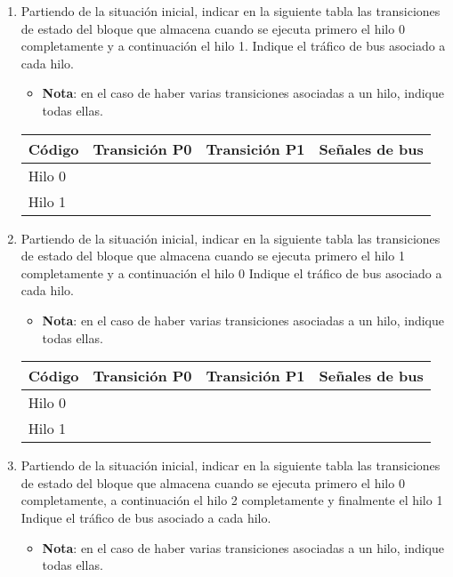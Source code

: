 \begin{enumerate}

\item Partiendo de la situación inicial, indicar en la siguiente tabla las
transiciones de estado del bloque que almacena  cuando se ejecuta primero el
hilo 0 completamente y a continuación el hilo 1. Indique el tráfico de bus
asociado a cada hilo. 
  \begin{itemize}
    \item \textbf{Nota}: en el caso de haber varias transiciones asociadas a un hilo, 
          indique todas ellas.
  \end{itemize}

\begin{tabular}{|l|l|l|l|}
\hline
Código & Transición P0 & Transición P1 & Señales de bus\\
\hline\hline
Hilo 0 & & & \\
\hline
Hilo 1 & & & \\
\hline
\end{tabular}

\item Partiendo de la situación inicial, indicar en la siguiente tabla las
transiciones de estado del bloque que almacena  cuando se ejecuta
primero el hilo 1 completamente y a continuación el hilo 0 Indique el tráfico de
bus asociado a cada hilo. 

  \begin{itemize}
    \item \textbf{Nota}: en el caso de haber varias transiciones asociadas a un hilo, 
          indique todas ellas.
  \end{itemize}

\begin{tabular}{|l|l|l|l|}
\hline
Código & Transición P0 & Transición P1 & Señales de bus\\
\hline\hline
Hilo 0 & & & \\
\hline
Hilo 1 & & & \\
\hline
\end{tabular}

\item Partiendo de la situación inicial, indicar en la siguiente tabla las
transiciones de estado del bloque que almacena  cuando se ejecuta primero el
hilo 0 completamente, a continuación el hilo 2 completamente y finalmente el
hilo 1 Indique el tráfico de bus asociado a cada hilo. 

  \begin{itemize}
    \item \textbf{Nota}: en el caso de haber varias transiciones asociadas a un hilo, 
          indique todas ellas.
  \end{itemize}


\end{enumerate}
